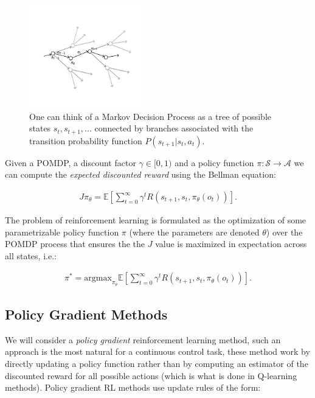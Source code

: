 \begin{figure}[h!]
    \centering
    \includegraphics[width=0.45\textwidth]{figures/MDP.pdf}
    \caption{One can think of a Markov Decision Process as a tree of possible states $s_t, s_{t+1},...$ connected by branches associated with the transition probability function $P(s_{t+1}|s_t,a_t)$.}
\end{figure}

Given a POMDP, a discount factor $\gamma \in [0,1)$ and a policy function $\pi :\mathcal{S}\rightarrow\mathcal{A}$ we can compute the \textit{expected discounted reward} using the Bellman equation: 

\begin{align*}
    J{\pi_\theta} = \mathbb{E} \left[ \sum^\infty_{t=0} \gamma^t R(s_{t+1},s_t,\pi_\theta(o_t)) \right].
\end{align*}

The problem of reinforcement learning is formulated as the optimization of some parametrizable policy function $\pi$ (where the parameters are denoted $\theta$) over the POMDP process that ensures the the $J$ value is maximized in expectation across all states, i.e.:

\begin{align*}
    \pi^* = \text{argmax}_{\pi_\theta} \mathbb{E} \left[ \sum^\infty_{t=0} \gamma^t R(s_{t+1},s_t,\pi_\theta(o_t)) \right].
\end{align*}

\subsection{Policy Gradient Methods}

We will consider a \textit{policy gradient} reinforcement learning method, such an approach is the most natural for a continuous control task, these method work by directly updating a policy function rather than by computing an estimator of the discounted reward for all possible actions (which is what is done in Q-learning methods). Policy gradient RL methods use update rules of the form:

